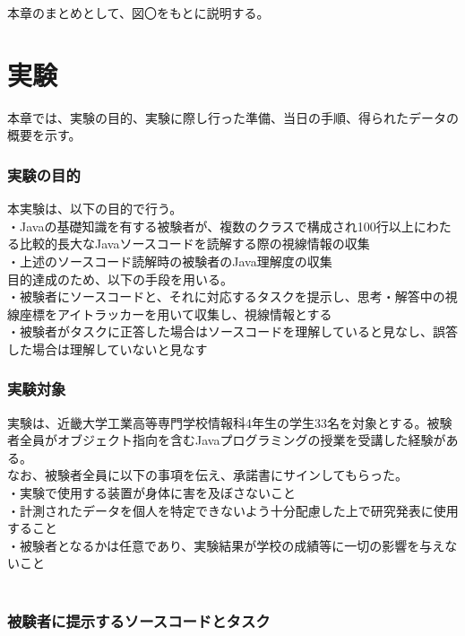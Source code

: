 \documentclass[paper=a4paper,fontsize=11pt]{jlreq}
\begin{document}
    本章のまとめとして、図〇をもとに説明する。


\clearpage

\part{実験}
  本章では、実験の目的、実験に際し行った準備、当日の手順、得られたデータの概要を示す。\\

  \section{実験の目的}
    本実験は、以下の目的で行う。\\
    ・Javaの基礎知識を有する被験者が、複数のクラスで構成され100行以上にわたる比較的長大なJavaソースコードを読解する際の視線情報の収集\\
    ・上述のソースコード読解時の被験者のJava理解度の収集\\

    目的達成のため、以下の手段を用いる。\\
    ・被験者にソースコードと、それに対応するタスクを提示し、思考・解答中の視線座標をアイトラッカーを用いて収集し、視線情報とする\\
    ・被験者がタスクに正答した場合はソースコードを理解していると見なし、誤答した場合は理解していないと見なす\\


  \section{実験対象}
    実験は、近畿大学工業高等専門学校情報科4年生の学生33名を対象とする。被験者全員がオブジェクト指向を含むJavaプログラミングの授業を受講した経験がある。\\
    なお、被験者全員に以下の事項を伝え、承諾書にサインしてもらった。\\
    ・実験で使用する装置が身体に害を及ぼさないこと\\
    ・計測されたデータを個人を特定できないよう十分配慮した上で研究発表に使用すること\\
    ・被験者となるかは任意であり、実験結果が学校の成績等に一切の影響を与えないこと\\
    \\

  \section{被験者に提示するソースコードとタスク}
\end{document}
